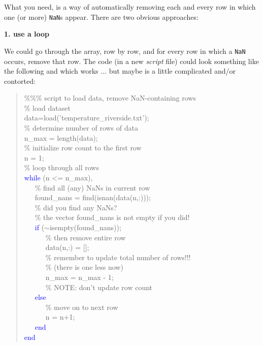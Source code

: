 \documentclass{tufte-book} %
\newenvironment{docspec}{\begin{quotation}\ttfamily\parskip0pt\parindent0pt\ignorespaces}{\end{quotation}}
\begin{document}
What you need, is a way of automatically removing each and every row in which one (or more) \texttt{NaN}s appear. There are two obvious approaches:

\vspace{2mm}
\textbf{1. use a loop}
\vspace{2mm}

\noindent We could go through the array, row by row, and for every row in which a \texttt{NaN} occurs, remove that row. The code (in a new \textit{script} file) could look something like the following and which works ... but maybe is a little complicated and/or contorted:

\begin{docspec}
\textcolor[rgb]{0,0.501961,0}{\%\%\% script to load data, remove NaN-containing rows}\\
\textcolor[rgb]{0,0.501961,0}{\% load dataset}\\
data=load(\textcolor[rgb]{1,0,1}{'temperature\_riverside.txt'});\\
\textcolor[rgb]{0,0.501961,0}{\% determine number of rows of data}\\
n\_max = length(data);\\
\textcolor[rgb]{0,0.501961,0}{\% initialize row count to the first row}\\
n = 1;\\
\textcolor[rgb]{0,0.501961,0}{\% loop through all rows}\\
\textcolor{blue}{while} (n <= n\_max),\\
\ \ \ \textcolor[rgb]{0,0.501961,0}{\% find all (any) NaNs in current row}\\
\ \ \    found\_nans = find(isnan(data(n,:)));\\
\ \ \ \textcolor[rgb]{0,0.501961,0}{\% did you find any NaNs?}\\
\ \ \ \textcolor[rgb]{0,0.501961,0}{\% the vector found\_nans is not empty if you did!}\\
\ \ \    \textcolor{blue}{if} (\(\sim\)isempty(found\_nans));\\
\ \ \ \ \ \        \textcolor[rgb]{0,0.501961,0}{\% then remove entire row}\\
\ \ \ \ \ \        data(n,:) = [];\\
\ \ \ \ \ \        \textcolor[rgb]{0,0.501961,0}{\% remember to update total number of rows!!!}\\
\ \ \ \ \ \        \textcolor[rgb]{0,0.501961,0}{\% (there is one less now)}\\
\ \ \ \ \ \        n\_max = n\_max - 1;\\
\ \ \ \ \ \        \textcolor[rgb]{0,0.501961,0}{\% NOTE: don't update row count}\\
\ \ \    \textcolor{blue}{else}\\
\ \ \ \ \ \        \textcolor[rgb]{0,0.501961,0}{\% move on to next row}\\
\ \ \ \ \ \        n = n+1;\\
\ \ \    \textcolor{blue}{end}\\
\textcolor{blue}{end}\\
\end{docspec}
\end{document}

